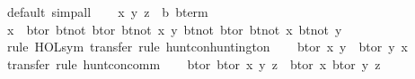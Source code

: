 \begin{isabellebody}
%
\isadelimproof
%
\endisadelimproof
%
\isatagproof
{}\isamarkupfalse%
\ {}default{}\ simp{}all{}\isanewline
\ \ \isamarkupfalse%
\ x\ y\ z\ {}{}\ {}{}b\ bterm{}\isanewline
\ \ \isamarkupfalse%
\ {}x\ {}\ bt{}or\ {}bt{}not\ {}bt{}or\ {}bt{}not\ x{}\ y{}{}\ {}bt{}not\ {}bt{}or\ {}bt{}not\ x{}\ {}bt{}not\ y{}{}{}{}\isanewline
\ \ \ \ \isamarkupfalse%
\ {}rule\ HOL{}sym{}\ transfer{}\ rule\ hunt{}con{}huntington{}\isanewline
\ \ \isamarkupfalse%
\ {}bt{}or\ x\ y\ {}\ bt{}or\ y\ x{}\isanewline
\ \ \ \ \isamarkupfalse%
\ {}transfer{}\ rule\ hunt{}con{}comm{}\isanewline
\ \ \isamarkupfalse%
\ {}bt{}or\ {}bt{}or\ x\ y{}\ z\ {}\ bt{}or\ x\ {}bt{}or\ y\ z{}{}\isanewline

\end{isabellebody}
